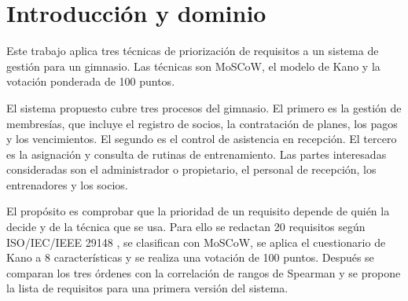 \section{Introducción y dominio}

Este trabajo aplica tres técnicas de priorización de requisitos a un sistema de gestión para un gimnasio. Las técnicas son MoSCoW, el modelo de Kano y la votación ponderada de 100 puntos.

El sistema propuesto cubre tres procesos del gimnasio. El primero es la gestión de membresías, que incluye el registro de socios, la contratación de planes, los pagos y los vencimientos. El segundo es el control de asistencia en recepción. El tercero es la asignación y consulta de rutinas de entrenamiento. Las partes interesadas consideradas son el administrador o propietario, el personal de recepción, los entrenadores y los socios.

El propósito es comprobar que la prioridad de un requisito depende de quién la decide y de la técnica que se usa. Para ello se redactan 20 requisitos según ISO/IEC/IEEE 29148 \cite{ieee29148}, se clasifican con MoSCoW, se aplica el cuestionario de Kano a 8 características y se realiza una votación de 100 puntos. Después se comparan los tres órdenes con la correlación de rangos de Spearman y se propone la lista de requisitos para una primera versión del sistema.
